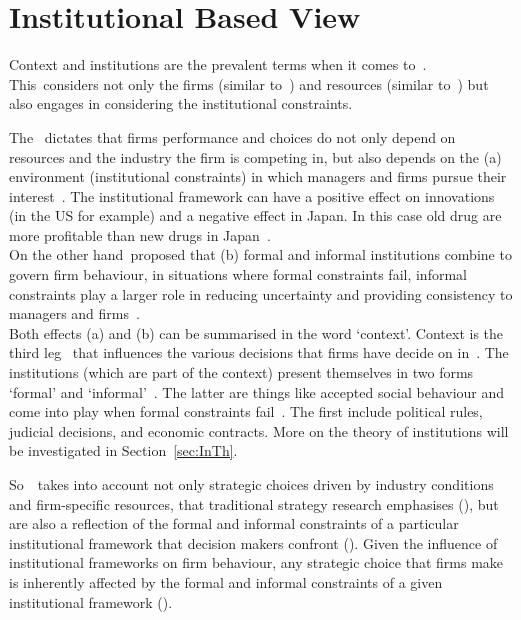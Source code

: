 \section{Institutional Based View}\label{ch:peng}

Context and institutions are the prevalent terms when it comes to~\ibv. %
This~\ibv considers not only the firms (similar to~\cite{Porter:1980to}) and resources (similar to~\cite{Barney:1991ur}) but also engages in considering the institutional constraints.

The \ibv~dictates that firms performance and choices do not only depend on resources and the industry the firm is competing in, but also depends on the (a) environment (institutional constraints) in which managers and firms pursue their interest~\citep{Peng:2008b}.%
The institutional framework can have a positive effect on innovations (in the US for example) and a negative effect in Japan. 
In this case old drug are more profitable than new drugs in Japan~\citep{Peng:2008b}. \\
On the other hand~\ibv proposed that (b) formal and informal institutions combine to govern firm behaviour, in situations where formal constraints fail, informal constraints play a larger role in reducing uncertainty and providing consistency to managers and firms~\citep{Peng:2008b}. \\
Both effects (a) and (b) can be summarised in the word `context'. Context is the third leg~\cite{Peng:2009vt} that influences the various decisions that firms have decide on in~\ib. 
The institutions (which are part of the context) present themselves in two forms `formal' and `informal'~\citep{Peng:2002ef}. 
The latter are things like accepted social behaviour and come into play when formal constraints fail~\citep{North:1990vl,DiMaggio:1983wt,Scott:2001tt}.
The first include political rules, judicial decisions, and economic contracts. 
More on the theory of institutions will be investigated in Section~\ref{sec:InTh}.

So~\ibv~takes into account not only strategic choices driven by industry conditions and firm-specific resources, that traditional strategy research emphasises (\cite{Porter:1980to,Barney:1991ur}), but are also a reflection of the formal and informal constraints of a particular institutional framework that decision makers confront (\cite{Oliver:1997wj,Scott:2001tt}). Given the influence of institutional frameworks on firm behaviour, any strategic choice that firms make is inherently affected by the formal and informal constraints of a given institutional framework (\cite{North:1990vl,Oliver:1997wj}). 

